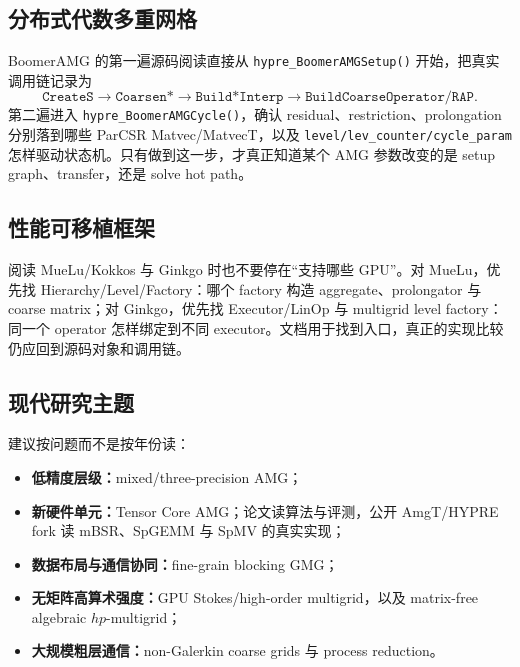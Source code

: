 \subsection{分布式代数多重网格}

BoomerAMG 的第一遍源码阅读直接从 \texttt{hypre\_BoomerAMGSetup()} 开始\cite{falgout2002hypre,hypreBoomer2026}，把真实调用链记录为
\begin{equation}
\texttt{CreateS}
\rightarrow
\texttt{Coarsen*}
\rightarrow
\texttt{Build*Interp}
\rightarrow
\texttt{BuildCoarseOperator/RAP}.
\end{equation}
第二遍进入 \texttt{hypre\_BoomerAMGCycle()}，确认 residual、restriction、prolongation 分别落到哪些 ParCSR Matvec/MatvecT，以及 \texttt{level/lev\_counter/cycle\_param} 怎样驱动状态机。只有做到这一步，才真正知道某个 AMG 参数改变的是 setup graph、transfer，还是 solve hot path。

\subsection{性能可移植框架}

阅读 MueLu/Kokkos 与 Ginkgo 时也不要停在“支持哪些 GPU”。对 MueLu，优先找 Hierarchy/Level/Factory：哪个 factory 构造 aggregate、prolongator 与 coarse matrix；对 Ginkgo，优先找 Executor/LinOp 与 multigrid level factory：同一个 operator 怎样绑定到不同 executor。文档用于找到入口，真正的实现比较仍应回到源码对象和调用链\cite{edwards2014kokkos,mueluDocs2026,ginkgo2022}。

\subsection{现代研究主题}

建议按问题而不是按年份读：
\begin{itemize}
\item \textbf{低精度层级：}mixed/three-precision AMG\cite{tsai2023mixed,tsai2023three,zong2024fp16}；
\item \textbf{新硬件单元：}Tensor Core AMG；论文读算法与评测，公开 AmgT/HYPRE fork 读 mBSR、SpGEMM 与 SpMV 的真实实现\cite{lu2024amgt,amgtRepo2026}；
\item \textbf{数据布局与通信协同：}fine-grain blocking GMG\cite{antepara2024brick}；
\item \textbf{无矩阵高算术强度：}GPU Stokes/high-order multigrid，以及 matrix-free algebraic $hp$-multigrid\cite{stokesgpu2025,ohm2026hpmg}；
\item \textbf{大规模粗层通信：}non-Galerkin coarse grids 与 process reduction\cite{falgout2014nongalerkin}。
\end{itemize}

